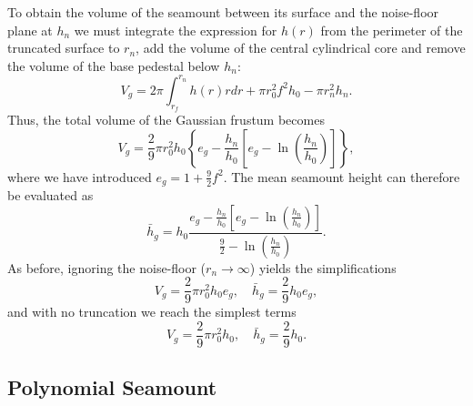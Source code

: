 To obtain the volume of the seamount between its surface and the noise-floor plane at $h_n$ we
must integrate the expression for $h(r)$ from the perimeter of the truncated
surface to $r_n$, add the volume of the central cylindrical core and remove
the volume of the base pedestal below $h_n$:
\begin{equation*}
V_g = 2\pi \int_{r_f}^{r_n} h(r) r dr + \pi r_0^2 f^2 h_0 - \pi r_n^2 h_n.
\end{equation*}
Thus, the total volume of the Gaussian frustum becomes
\begin{equation}
V_g = \frac{2}{9} \pi r_0^2 h_0 \left \{ e_g - \frac{h_n}{h_0} \left [ e_g - \ln{\left (\frac{h_n}{h_0}\right )} \right] \right \},
\end{equation}
where we have introduced $e_g = 1 + \frac{9}{2}f^2$.
The mean seamount height can therefore be evaluated as
\begin{equation}
\bar{h}_g =  h_0 \frac{ e_g - \frac{h_n}{h_0} \left [ e_g - \ln{\left (\frac{h_n}{h_0}\right )} \right]}{\frac{9}{2} - \ln{\left( \frac{h_n}{h_0} \right )}}.
\end{equation}
As before, ignoring the noise-floor ($r_n \rightarrow \infty$) yields the simplifications
\begin{equation*}
V_g = \frac{2}{9} \pi r_0^2 h_0 e_g , \quad \bar{h}_g =  \frac{2}{9} h_0 e_g,
\end{equation*}
and with no truncation we reach the simplest terms
\begin{equation*}
V_g = \frac{2}{9} \pi r_0^2 h_0, \quad \bar{h}_g =  \frac{2}{9} h_0.
\end{equation*}

\subsection{Polynomial Seamount}

